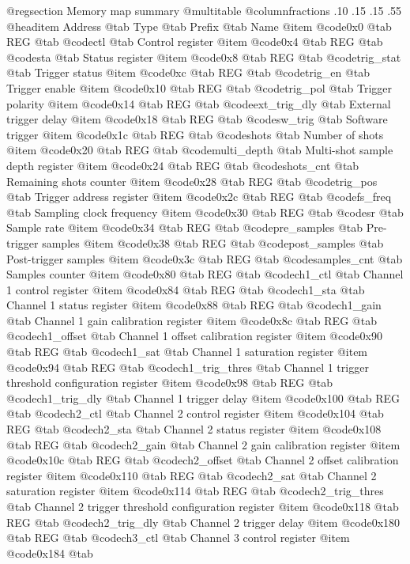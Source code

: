 @regsection Memory map summary
@multitable  @columnfractions .10 .15 .15 .55
@headitem Address @tab Type @tab Prefix @tab Name
@item @code{0x0} @tab
REG @tab
@code{ctl} @tab
Control register
@item @code{0x4} @tab
REG @tab
@code{sta} @tab
Status register
@item @code{0x8} @tab
REG @tab
@code{trig_stat} @tab
Trigger status
@item @code{0xc} @tab
REG @tab
@code{trig_en} @tab
Trigger enable
@item @code{0x10} @tab
REG @tab
@code{trig_pol} @tab
Trigger polarity
@item @code{0x14} @tab
REG @tab
@code{ext_trig_dly} @tab
External trigger delay
@item @code{0x18} @tab
REG @tab
@code{sw_trig} @tab
Software trigger
@item @code{0x1c} @tab
REG @tab
@code{shots} @tab
Number of shots
@item @code{0x20} @tab
REG @tab
@code{multi_depth} @tab
Multi-shot sample depth register
@item @code{0x24} @tab
REG @tab
@code{shots_cnt} @tab
Remaining shots counter
@item @code{0x28} @tab
REG @tab
@code{trig_pos} @tab
Trigger address register
@item @code{0x2c} @tab
REG @tab
@code{fs_freq} @tab
Sampling clock frequency
@item @code{0x30} @tab
REG @tab
@code{sr} @tab
Sample rate
@item @code{0x34} @tab
REG @tab
@code{pre_samples} @tab
Pre-trigger samples
@item @code{0x38} @tab
REG @tab
@code{post_samples} @tab
Post-trigger samples
@item @code{0x3c} @tab
REG @tab
@code{samples_cnt} @tab
Samples counter
@item @code{0x80} @tab
REG @tab
@code{ch1_ctl} @tab
Channel 1 control register
@item @code{0x84} @tab
REG @tab
@code{ch1_sta} @tab
Channel 1 status register
@item @code{0x88} @tab
REG @tab
@code{ch1_gain} @tab
Channel 1 gain calibration register
@item @code{0x8c} @tab
REG @tab
@code{ch1_offset} @tab
Channel 1 offset calibration register
@item @code{0x90} @tab
REG @tab
@code{ch1_sat} @tab
Channel 1 saturation register
@item @code{0x94} @tab
REG @tab
@code{ch1_trig_thres} @tab
Channel 1 trigger threshold configuration register
@item @code{0x98} @tab
REG @tab
@code{ch1_trig_dly} @tab
Channel 1 trigger delay
@item @code{0x100} @tab
REG @tab
@code{ch2_ctl} @tab
Channel 2 control register
@item @code{0x104} @tab
REG @tab
@code{ch2_sta} @tab
Channel 2 status register
@item @code{0x108} @tab
REG @tab
@code{ch2_gain} @tab
Channel 2 gain calibration register
@item @code{0x10c} @tab
REG @tab
@code{ch2_offset} @tab
Channel 2 offset calibration register
@item @code{0x110} @tab
REG @tab
@code{ch2_sat} @tab
Channel 2 saturation register
@item @code{0x114} @tab
REG @tab
@code{ch2_trig_thres} @tab
Channel 2 trigger threshold configuration register
@item @code{0x118} @tab
REG @tab
@code{ch2_trig_dly} @tab
Channel 2 trigger delay
@item @code{0x180} @tab
REG @tab
@code{ch3_ctl} @tab
Channel 3 control register
@item @code{0x184} @tab
